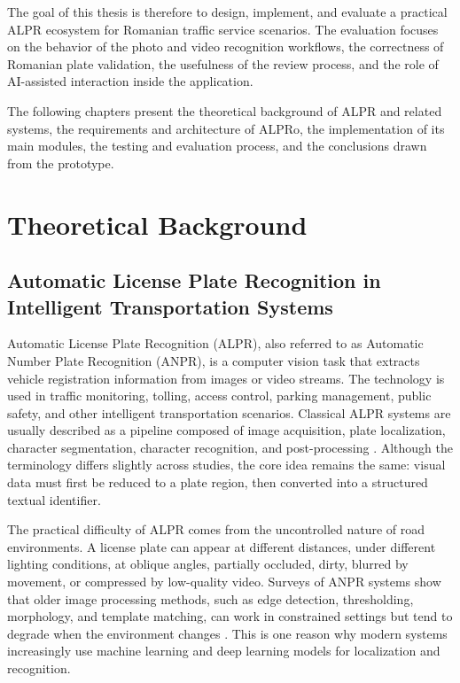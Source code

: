 ﻿\documentclass[12pt,a4paper]{article}
\begin{document}
The goal of this thesis is therefore to design, implement, and evaluate a practical ALPR ecosystem for Romanian traffic service scenarios. The evaluation focuses on the behavior of the photo and video recognition workflows, the correctness of Romanian plate validation, the usefulness of the review process, and the role of AI-assisted interaction inside the application.

The following chapters present the theoretical background of ALPR and related systems, the requirements and architecture of ALPRo, the implementation of its main modules, the testing and evaluation process, and the conclusions drawn from the prototype.

\section{Theoretical Background}

\subsection{Automatic License Plate Recognition in Intelligent Transportation Systems}

Automatic License Plate Recognition (ALPR), also referred to as Automatic Number Plate Recognition (ANPR), is a computer vision task that extracts vehicle registration information from images or video streams. The technology is used in traffic monitoring, tolling, access control, parking management, public safety, and other intelligent transportation scenarios. Classical ALPR systems are usually described as a pipeline composed of image acquisition, plate localization, character segmentation, character recognition, and post-processing \cite{Du2013,Mufti2021}. Although the terminology differs slightly across studies, the core idea remains the same: visual data must first be reduced to a plate region, then converted into a structured textual identifier.

The practical difficulty of ALPR comes from the uncontrolled nature of road environments. A license plate can appear at different distances, under different lighting conditions, at oblique angles, partially occluded, dirty, blurred by movement, or compressed by low-quality video. Surveys of ANPR systems show that older image processing methods, such as edge detection, thresholding, morphology, and template matching, can work in constrained settings but tend to degrade when the environment changes \cite{Mufti2021}. This is one reason why modern systems increasingly use machine learning and deep learning models for localization and recognition.
\end{document}
